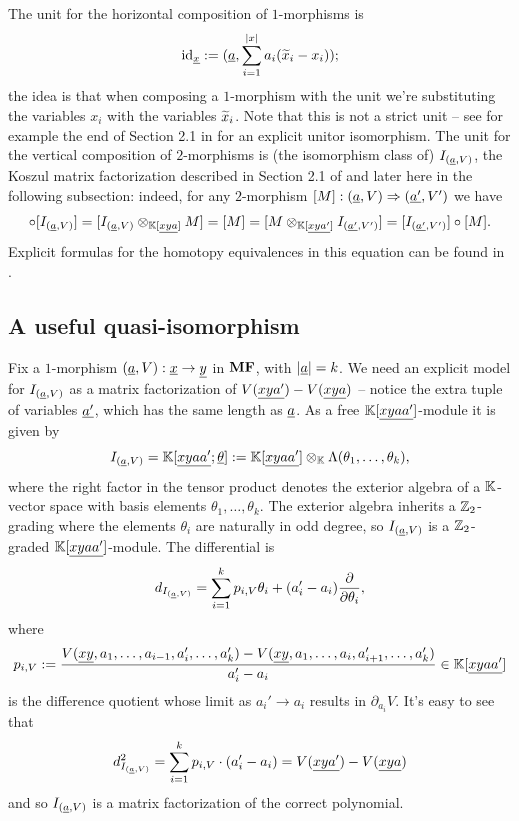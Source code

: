 The unit for the horizontal composition of $1$-morphisms is
\begin{equation*}
	\mathrm{id}_{\underline{x}} := (\underline{a}, \sum_{i = 1}^{\left\lvert x \right\rvert} a_i(\widetilde{x}_i - x_i));
\end{equation*}
the idea is that when composing a $1$-morphism with the unit we're substituting the variables $x_i$ with the variables $\widetilde{x}_i$. Note that this is not a strict unit -- see for example the end of Section 2.1 in \cite{BCR2023} for an explicit unitor isomorphism. The unit for the vertical composition of $2$-morphisms is (the isomorphism class of) $I_{(\underline{a}, V)}$, the Koszul matrix factorization described in Section 2.1 of \cite{BCR2023} and later here in the following subsection: indeed, for any $2$-morphism $[M] : (\underline{a}, V) \Rightarrow (\underline{a'}, V')$ we have
\begin{equation*}
	[M] \circ [I_{(\undl{a}, V)}] = [I_{(\undl{a}, V)} \otimes_{\KK[\undl{xya}]} M] = [M] = [M \otimes_{\KK[\undl{xya'}]} I_{(\undl{a'}, V')}] = [I_{(\undl{a'}, V')}] \circ [M].
\end{equation*}
Explicit formulas for the homotopy equivalences in this equation can be found in \cite{CM2016,CM2020}.

\subsection{A useful quasi-isomorphism}

Fix a $1$-morphism $(\underline{a}, V) : \underline{x} \to \underline{y}$ in $\mathbf{MF}$, with $\left\lvert \underline{a} \right\rvert = k$. We need an explicit model for $I_{(\underline{a}, V)}$ as a matrix factorization of $V(\underline{xya'}) - V(\underline{xya})$ -- notice the extra tuple of variables $\underline{a'}$, which has the same length as $\underline{a}$. As a free $\mathbb{K}[\underline{xyaa'}]$-module it is given by
\begin{equation*}
	I_{(\underline{a}, V)} = \mathbb{K}[\underline{xyaa'}; \underline{\theta}] := \mathbb{K}[\underline{xyaa'}] \otimes_{\mathbb{K}} \Lambda (\theta_1, \dotsc, \theta_k),
\end{equation*}
where the right factor in the tensor product denotes the exterior algebra of a $\mathbb{K}$-vector space with basis elements $\theta_1, \dotsc, \theta_k$. The exterior algebra inherits a $\mathbb{Z}_2$-grading where the elements $\theta_i$ are naturally in odd degree, so $I_{(\underline{a},V)}$ is a $\mathbb{Z}_2$-graded $\mathbb{K}[\underline{xyaa'}]$-module. The differential is
\begin{equation*}
	d_{I_{(\underline{a}, V)}} = \sum_{i = 1}^k p_{i,V} \theta_i + (a_i' - a_i) \frac{\partial}{\partial \theta_i},
\end{equation*}
where
\begin{equation*}
	p_{i,V} := \frac{V(\underline{xy},a_1, \dotsc, a_{i-1}, a_i', \dotsc, a_k') - V(\underline{xy},a_1, \dotsc, a_{i}, a_{i+1}', \dotsc, a_k')}{a_i' - a_i} \in \mathbb{K}[\underline{xyaa'}]
\end{equation*}
is the difference quotient whose limit as $a_i' \to a_i$ results in $\partial_{a_i} V$. It's easy to see that
\begin{equation*}
	d_{I_{(\underline{a},V)}}^2 = \sum_{i = 1}^k p_{i,V} \cdot (a_i' - a_i) = V(\underline{xya'}) - V(\underline{xya})
\end{equation*}
and so $I_{(\underline{a}, V)}$ is a matrix factorization of the correct polynomial.

